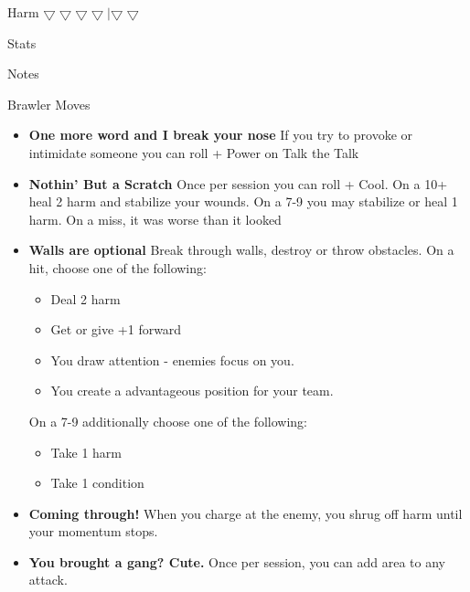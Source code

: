\documentclass{article}
\begin{document}
\medskip

\Large{}Harm \(\bigtriangledown \bigtriangledown \bigtriangledown \bigtriangledown | \bigtriangledown \bigtriangledown\)

\medskip

\Large{}Stats

\normalfont\Huge

\faBomb \faStar \faHeart \faBrain \faPizzaSlice \faCircle[regular]

\medskip

\Large{}Notes

\newpage

\Large{}Brawler Moves

\medskip

\normalfont\large

\begin{itemize}[label=$\square$]

\item \textbf{One more word and I break your nose} If you try to provoke or intimidate someone you can roll + Power on Talk the Talk

\item \textbf{Nothin’ But a Scratch} Once per session you can roll + Cool. On a 10+ heal 2 harm and stabilize your wounds. On a 7-9 you may stabilize or heal 1 harm. On a miss, it was worse than it looked

\item \textbf{Walls are optional} Break through walls, destroy or throw obstacles. On a hit, choose one of the following:
\vspace{-6pt}
\begin{itemize}
    \setlength\itemsep{-0.5em}
\item Deal 2 harm
\item Get or give +1 forward
\item You draw attention - enemies focus on you.
\item You create a advantageous position for your team.
\end{itemize}
\vspace{-6pt}
On a 7-9 additionally choose one of the following:
\vspace{-6pt}
\begin{itemize}
    \setlength\itemsep{-0.5em}
\item  Take 1 harm
\item  Take 1 condition
\end{itemize}

\item \textbf{Coming through!} When you charge at the enemy, you shrug off harm until your momentum stops.

\item \textbf{You brought a gang? Cute.} Once per session, you can add area to any attack.

\end{itemize}
\end{document}
